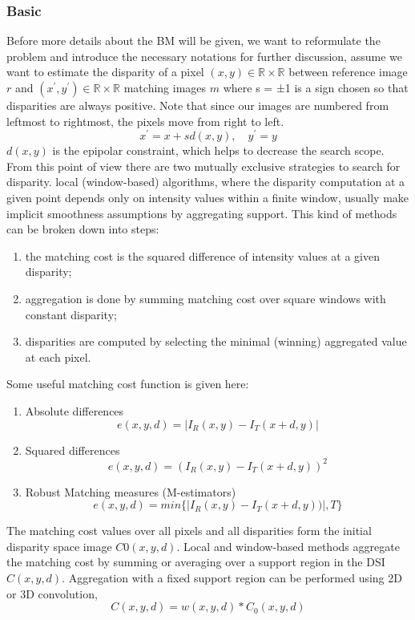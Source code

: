 \subsubsection{Basic}
\label{BM Algorithm}
Before more details about the BM will be given, we want to reformulate the problem and introduce the necessary notations for further discussion, assume we want to estimate the disparity of a pixel $(x,y) \in \mathbb{R}\times \mathbb{R}$ between reference image $r$ and  $(x^{'},y^{'}) \in \mathbb{R}\times \mathbb{R}$ matching images $m$ where s = ±1 is a sign chosen so that disparities are always positive. Note that since our images are numbered from leftmost to rightmost, the pixels move from right to left\cite{scharstein2002taxonomy}.
\begin{equation}
    x^{'} = x + sd(x,y), \quad y^{'} = y
\end{equation}
$d(x,y)$ is the epipolar constraint, which helps to decrease the search scope. From this point of view there are two mutually exclusive strategies to search for disparity. local (window-based) algorithms, where the disparity computation at a given point depends only on intensity values within a finite window, usually make implicit smoothness assumptions by aggregating support. This kind of methods can be broken down into steps:
\begin{enumerate}
    \item the matching cost is the squared difference of intensity values at a given disparity;
    \item aggregation is done by summing matching cost over square windows with constant disparity;
    \item disparities are computed by selecting the minimal (winning) aggregated value at each pixel.
\end{enumerate}
Some useful matching cost function is given here:
\begin{enumerate}
    \item Absolute differences
        \begin{equation}
            e(x,y,d) = |I_R(x,y)-I_T(x+d,y)|
        \end{equation}
    \item Squared differences
        \begin{equation}
            e(x,y,d) = (I_R(x,y)-I_T(x+d,y))^2
        \end{equation}
    \item Robust Matching measures (M-estimators)
    \begin{equation}
        e(x,y,d) = min \{|I_R(x,y)-I_T(x+d,y))|, T \}
    \end{equation}
\end{enumerate}
The matching cost values over all pixels and all disparities form the initial disparity space image $C0(x, y, d)$. Local and window-based methods aggregate the matching cost by summing or averaging over a support region in the DSI  $C(x, y, d)$. Aggregation with a fixed support region can be performed using 2D or 3D convolution, 
\begin{equation}
    C(x, y, d) = w(x, y, d) \ast C_0(x, y, d)
\end{equation}



